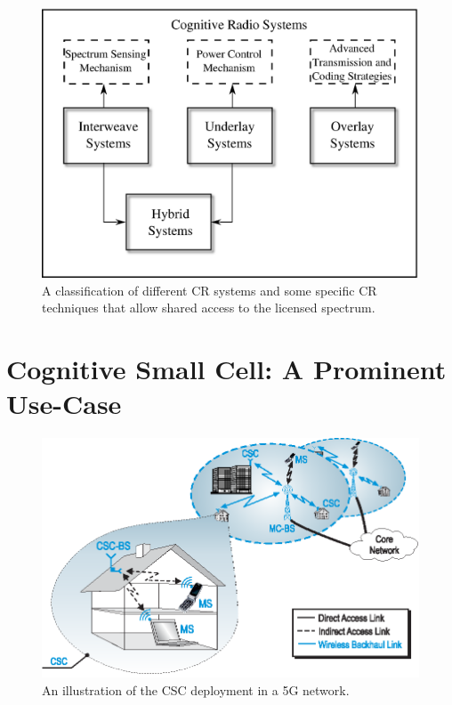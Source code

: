 \begin{figure}
\centering
\includegraphics[width = 0.85 \columnwidth]{figures/CR_paradigm}
\caption{A classification of different CR systems and some specific CR techniques that allow shared access to the licensed spectrum.}
\label{fig_Int:paradigm}
\end{figure}


\section{Cognitive Small Cell: A Prominent Use-Case}
\label{sec:CSC}
\begin{figure}
\centering
\includegraphics[width = 0.8 \columnwidth]{figures/Cellular_Scenario_CR_T6}
\caption{An illustration of the CSC deployment in a 5G network.}
\label{fig_Int:archi}
\end{figure}

